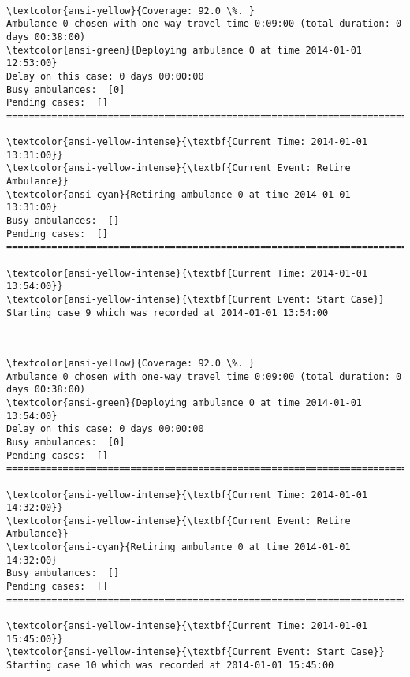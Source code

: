 \documentclass[11pt]{article}
\begin{document}
    \begin{center}
    \end{center}
    { \hspace*{\fill} \\}
    
    \begin{Verbatim}[commandchars=\\\{\}]
\textcolor{ansi-yellow}{Coverage: 92.0 \%. }
Ambulance 0 chosen with one-way travel time 0:09:00 (total duration: 0 days 00:38:00)
\textcolor{ansi-green}{Deploying ambulance 0 at time 2014-01-01 12:53:00}
Delay on this case: 0 days 00:00:00
Busy ambulances:  [0]
Pending cases:  []
========================================================================

\textcolor{ansi-yellow-intense}{\textbf{Current Time: 2014-01-01 13:31:00}}
\textcolor{ansi-yellow-intense}{\textbf{Current Event: Retire Ambulance}}
\textcolor{ansi-cyan}{Retiring ambulance 0 at time 2014-01-01 13:31:00}
Busy ambulances:  []
Pending cases:  []
========================================================================

\textcolor{ansi-yellow-intense}{\textbf{Current Time: 2014-01-01 13:54:00}}
\textcolor{ansi-yellow-intense}{\textbf{Current Event: Start Case}}
Starting case 9 which was recorded at 2014-01-01 13:54:00

    \end{Verbatim}

    \begin{center}
    \end{center}
    { \hspace*{\fill} \\}
    
    \begin{Verbatim}[commandchars=\\\{\}]
\textcolor{ansi-yellow}{Coverage: 92.0 \%. }
Ambulance 0 chosen with one-way travel time 0:09:00 (total duration: 0 days 00:38:00)
\textcolor{ansi-green}{Deploying ambulance 0 at time 2014-01-01 13:54:00}
Delay on this case: 0 days 00:00:00
Busy ambulances:  [0]
Pending cases:  []
========================================================================

\textcolor{ansi-yellow-intense}{\textbf{Current Time: 2014-01-01 14:32:00}}
\textcolor{ansi-yellow-intense}{\textbf{Current Event: Retire Ambulance}}
\textcolor{ansi-cyan}{Retiring ambulance 0 at time 2014-01-01 14:32:00}
Busy ambulances:  []
Pending cases:  []
========================================================================

\textcolor{ansi-yellow-intense}{\textbf{Current Time: 2014-01-01 15:45:00}}
\textcolor{ansi-yellow-intense}{\textbf{Current Event: Start Case}}
Starting case 10 which was recorded at 2014-01-01 15:45:00

    \end{Verbatim}
\end{document}
